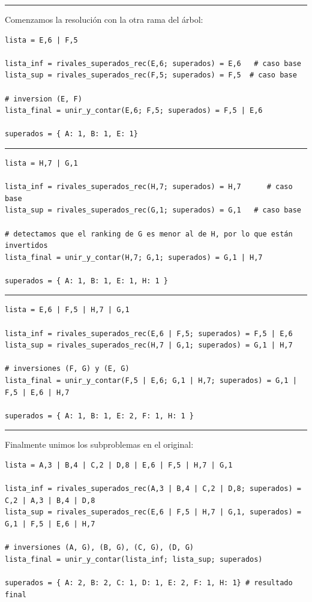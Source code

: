 \documentclass[titlepage,a4paper]{article}
\begin{document}
\noindent\rule{\textwidth}{0.5pt}

Comenzamos la resolución con la otra rama del árbol:

\begin{verbatim}
lista = E,6 | F,5

lista_inf = rivales_superados_rec(E,6; superados) = E,6   # caso base
lista_sup = rivales_superados_rec(F,5; superados) = F,5  # caso base

# inversion (E, F)
lista_final = unir_y_contar(E,6; F,5; superados) = F,5 | E,6

superados = { A: 1, B: 1, E: 1}
\end{verbatim}

\noindent\rule{\textwidth}{0.5pt}
\begin{verbatim}
lista = H,7 | G,1

lista_inf = rivales_superados_rec(H,7; superados) = H,7      # caso base
lista_sup = rivales_superados_rec(G,1; superados) = G,1   # caso base

# detectamos que el ranking de G es menor al de H, por lo que están invertidos
lista_final = unir_y_contar(H,7; G,1; superados) = G,1 | H,7

superados = { A: 1, B: 1, E: 1, H: 1 }
\end{verbatim}

\noindent\rule{\textwidth}{0.5pt}

\begin{verbatim}
lista = E,6 | F,5 | H,7 | G,1

lista_inf = rivales_superados_rec(E,6 | F,5; superados) = F,5 | E,6
lista_sup = rivales_superados_rec(H,7 | G,1; superados) = G,1 | H,7

# inversiones (F, G) y (E, G)
lista_final = unir_y_contar(F,5 | E,6; G,1 | H,7; superados) = G,1 | F,5 | E,6 | H,7

superados = { A: 1, B: 1, E: 2, F: 1, H: 1 }
\end{verbatim}

\noindent\rule{\textwidth}{0.5pt}

Finalmente unimos los subproblemas en el original:

\begin{verbatim}
lista = A,3 | B,4 | C,2 | D,8 | E,6 | F,5 | H,7 | G,1

lista_inf = rivales_superados_rec(A,3 | B,4 | C,2 | D,8; superados) = C,2 | A,3 | B,4 | D,8
lista_sup = rivales_superados_rec(E,6 | F,5 | H,7 | G,1, superados) = G,1 | F,5 | E,6 | H,7

# inversiones (A, G), (B, G), (C, G), (D, G)
lista_final = unir_y_contar(lista_inf; lista_sup; superados)

superados = { A: 2, B: 2, C: 1, D: 1, E: 2, F: 1, H: 1} # resultado final
\end{verbatim}
\end{document}
